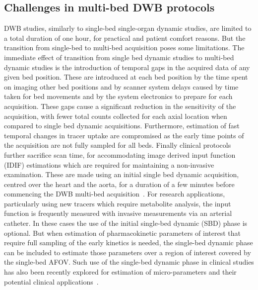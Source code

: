 \subsection{Challenges in multi-bed DWB protocols}
DWB studies, similarly to single-bed single-organ dynamic studies, are limited to a total duration of one hour, for practical and patient comfort reasons. 
But the transition from single-bed to multi-bed acquisition poses some limitations. 
The immediate effect of transition from single bed dynamic studies to multi-bed dynamic studies is the introduction of temporal gaps in the acquired data of any given bed position. These are introduced at each bed position by the time spent on imaging other bed positions and by scanner system delays caused by time taken for bed movements and by the system electronics to prepare for each acquisition. These gaps cause a significant reduction in the sensitivity of the acquisition, with fewer total counts collected for each axial location when compared to single bed dynamic acquisitions. Furthermore, estimation of fast temporal changes in tracer uptake are compromised as the early time points of the acquisition are not fully sampled for all beds. Finally clinical protocols further sacrifice scan time, for accommodating image derived input function (IDIF) estimations which are required for maintaining a non-invasive examination. These are made using an initial single bed dynamic acquisition, centred over the heart and the aorta, for a duration of a few minutes before commencing the DWB multi-bed acquisition~\cite{Karakatsanis2013,Hu2020}.
For research applications, particularly using new tracers which require metabolite analysis, the input function is frequently measured with invasive measurements via an arterial catheter. In these cases the use of the initial single-bed dynamic (SBD) phase is optional. But when estimation of pharmacokinetic parameters of interest that require full sampling of the early kinetics is needed, the single-bed dynamic phase can be included to estimate those parameters over a region of interest covered by the single-bed AFOV. Such use of the single-bed dynamic phase in clinical studies has also been recently explored for estimation of micro-parameters and their potential clinical applications~\cite{Zaker2020}.

